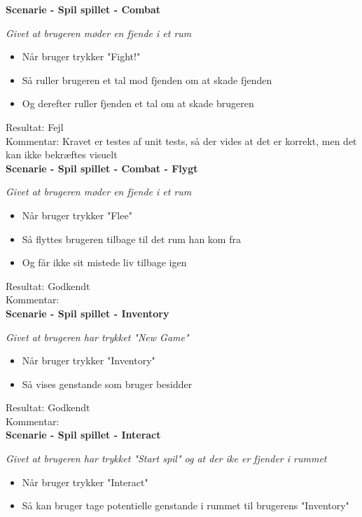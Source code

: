 \bf{Scenarie - Spil spillet - Combat}

\it{Givet at brugeren møder en fjende i et rum}

\begin{itemize}
  \item Når bruger trykker "Fight!"
  \item Så ruller brugeren et tal mod fjenden om at skade fjenden
  \item Og derefter ruller fjenden et tal om at skade brugeren
\end{itemize}

Resultat: Fejl\\
Kommentar: Kravet er testes af unit tests, så der vides at det er korrekt, men det kan ikke bekræftes visuelt\\

\bf{Scenarie - Spil spillet - Combat - Flygt}

\it{Givet at brugeren møder en fjende i et rum}

\begin{itemize}
  \item Når bruger trykker "Flee"
  \item Så flyttes brugeren tilbage til det rum han kom fra
  \item Og får ikke sit mistede liv tilbage igen
\end{itemize}

Resultat: Godkendt\\
Kommentar:\\

\bf{Scenarie - Spil spillet - Inventory}

\it{Givet at brugeren har trykket "New Game"}

\begin{itemize}
  \item Når bruger trykker "Inventory"
  \item Så vises genstande som bruger besidder
\end{itemize}

Resultat: Godkendt\\
Kommentar:\\

\bf{Scenarie - Spil spillet - Interact}

\it{Givet at brugeren har trykket "Start spil" og at der ike er fjender i rummet}

\begin{itemize}
  \item Når bruger trykker "Interact"
  \item Så kan bruger tage potentielle genstande i rummet til brugerens "Inventory"
\end{itemize}

